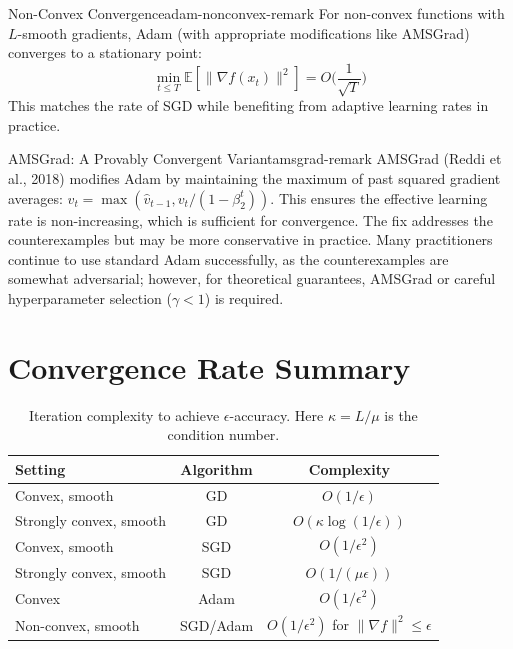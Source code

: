 \documentclass[../main.tex]{subfiles}
\begin{document}
\begin{remark}{Non-Convex Convergence}{adam-nonconvex-remark}
For non-convex functions with $L$-smooth gradients, Adam (with appropriate modifications like AMSGrad) converges to a stationary point:
\[
\min_{t \leq T} \mathbb{E}[\|\nabla f(x_t)\|^2] = O\Big(\frac{1}{\sqrt{T}}\Big)
\]
This matches the rate of SGD while benefiting from adaptive learning rates in practice.
\end{remark}

\begin{remark}{AMSGrad: A Provably Convergent Variant}{amsgrad-remark}
AMSGrad (Reddi et al., 2018) modifies Adam by maintaining the maximum of past squared gradient averages: $\hat{v}_t = \max(\hat{v}_{t-1}, v_t/(1-\beta_2^t))$. This ensures the effective learning rate is non-increasing, which is sufficient for convergence. The fix addresses the counterexamples but may be more conservative in practice. Many practitioners continue to use standard Adam successfully, as the counterexamples are somewhat adversarial; however, for theoretical guarantees, AMSGrad or careful hyperparameter selection ($\gamma < 1$) is required.
\end{remark}

\section{Convergence Rate Summary}\label{sec:convergence-summary}

\begin{table}[h]
\centering
\begin{tabular}{lcc}
\toprule
\textbf{Setting} & \textbf{Algorithm} & \textbf{Complexity} \\
\midrule
Convex, smooth & GD & $O(1/\epsilon)$ \\
Strongly convex, smooth & GD & $O(\kappa \log(1/\epsilon))$ \\
Convex, smooth & SGD & $O(1/\epsilon^2)$ \\
Strongly convex, smooth & SGD & $O(1/(\mu\epsilon))$ \\
Convex & Adam & $O(1/\epsilon^2)$ \\
Non-convex, smooth & SGD/Adam & $O(1/\epsilon^2)$ for $\|\nabla f\|^2 \leq \epsilon$ \\
\bottomrule
\end{tabular}
\caption{Iteration complexity to achieve $\epsilon$-accuracy. Here $\kappa = L/\mu$ is the condition number.}
\end{table}
\end{document}
